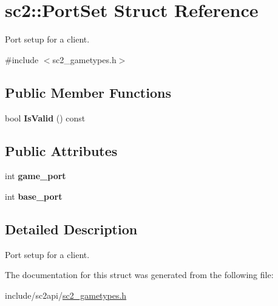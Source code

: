 \hypertarget{structsc2_1_1_port_set}{}\section{sc2\+:\+:Port\+Set Struct Reference}
\label{structsc2_1_1_port_set}


Port setup for a client.  




{\ttfamily \#include $<$sc2\+\_\+gametypes.\+h$>$}

\subsection*{Public Member Functions}
\begin{DoxyCompactItemize}
\item 
\mbox{\label{structsc2_1_1_port_set_a8c801fb77ca3bc51ce3ab566539e11d3}} 
bool {\bfseries Is\+Valid} () const
\end{DoxyCompactItemize}
\subsection*{Public Attributes}
\begin{DoxyCompactItemize}
\item 
\mbox{\label{structsc2_1_1_port_set_a58384f629c39ebf808adab5ea3165c8e}} 
int {\bfseries game\+\_\+port}
\item 
\mbox{\label{structsc2_1_1_port_set_a5ba64b614d73d0781a7ba3a49a2f5278}} 
int {\bfseries base\+\_\+port}
\end{DoxyCompactItemize}


\subsection{Detailed Description}
Port setup for a client. 

The documentation for this struct was generated from the following file\+:\begin{DoxyCompactItemize}
\item 
include/sc2api/\hyperlink{sc2__gametypes_8h}{sc2\+\_\+gametypes.\+h}\end{DoxyCompactItemize}
